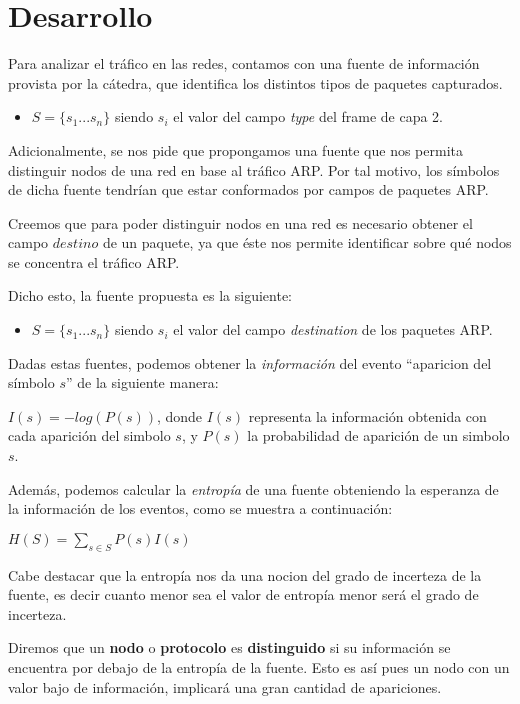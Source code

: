 \section{Desarrollo}

Para analizar el tráfico en las redes, contamos con una fuente de información provista por la cátedra, que identifica los distintos tipos de paquetes capturados.

\begin{itemize}
\item $S=\{s_1 ... s_n\}$ siendo $s_i$ el valor del campo \textit{type} del frame de capa 2.
\end{itemize}

Adicionalmente, se nos pide que propongamos una fuente que nos permita distinguir nodos de una red en base al tráfico ARP. Por tal motivo, los símbolos de dicha fuente tendrían que estar conformados por campos de paquetes ARP.

Creemos que para poder distinguir nodos en una red es necesario obtener el campo $destino$ de un paquete, ya que éste nos permite identificar sobre qué nodos se concentra el tráfico ARP.

Dicho esto, la fuente propuesta es la siguiente:

\begin{itemize}
\item $S=\{s_1 ... s_n\}$ siendo $s_i$ el valor del campo \textit{destination} de los paquetes ARP.
\end{itemize}


Dadas estas fuentes, podemos obtener la \textit{información} del evento ``aparicion del símbolo $s$'' de la siguiente manera:

$I(s) = -log(P(s))$, donde $I(s)$ representa la información obtenida con cada aparición del simbolo $s$, y $P(s)$ la probabilidad de aparición de un simbolo $s$.

Además, podemos calcular la \textit{entropía} de una fuente obteniendo la esperanza de la información de los eventos, como se muestra a continuación:

$H(S) = \sum_{s \in S} P(s) I(s)$

Cabe destacar que la entropía nos da una nocion del grado de incerteza de la fuente, es decir cuanto menor sea el valor de entropía menor será el grado de incerteza. 

Diremos que un \textbf{nodo} o \textbf{protocolo} es \textbf{distinguido} si su información se encuentra por debajo de la entropía de la fuente. Esto es así pues un nodo con un valor bajo de información, implicará una gran cantidad de apariciones.


